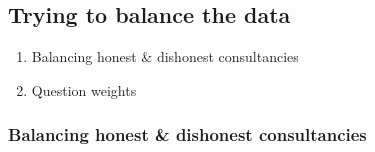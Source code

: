 \documentclass[
]{article}
\providecommand{\tightlist}{%
  \setlength{\itemsep}{0pt}\setlength{\parskip}{0pt}}
\begin{document}
\subsection{Trying to balance the
data}\label{trying-to-balance-the-data}

\begin{enumerate}
\def\labelenumi{\arabic{enumi}.}
\tightlist
\item
  Balancing honest \& dishonest consultancies
\item
  Question weights
\end{enumerate}

\subsubsection{Balancing honest \& dishonest
consultancies}\label{balancing-honest-dishonest-consultancies}
\end{document}
